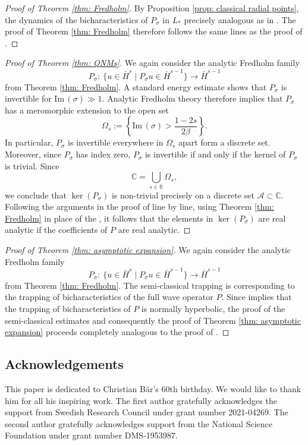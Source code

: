 \documentclass[pdftex]{sigma}
\renewcommand{\Im}{\mathrm{Im} \,}
\newcommand{\A}{\mathcal A}
\renewcommand{\b}{\beta}
\newcommand{\s}{\sigma}
\newcommand{\R}[0]{\mathbb{R}}
\newcommand{\C}[0]{\mathbb{C}}
\numberwithin{equation}{section}
\begin{document}
\begin{proof}[Proof of Theorem \ref{thm: Fredholm}]
By Proposition \ref{prop: classical radial points}, the dynamics of the bicharacteristics of $P_\s$ in $L_*$ precisely analogous as in \cite[Section~6.1]{V2013}.
The proof of Theorem \ref{thm: Fredholm} therefore follows the same lines as the proof of \cite[Theorem~1.4]{V2013}.
\end{proof}



\begin{proof}[Proof of Theorem \ref{thm: QNMs}]
We again consider the analytic Fredholm family
\[
  P_\s\colon\ \big\{u \in \bar H^s \mid P_\s u \in \bar H^{s-1} \big\} \to \bar H^{s-1}
\]
from Theorem \ref{thm: Fredholm}.
A standard energy estimate shows that $P_\s$ is invertible for $\Im(\s) \gg 1$.
Analytic Fredholm theory therefore implies that $P_\s$ has a meromorphic extension to the open set
\[
	\Omega_s
		:= \left\{ \Im (\s) > \frac{1 - 2s}{2\b} \right\}.
\]
In particular, $P_\s$ is invertible everywhere in $\Omega_s$ apart form a discrete set.
Moreover, since $P_\s$ has index zero, $P_\s$ is invertible if and only if the kernel of $P_\s$ is trivial.
Since
\[
	\C = \bigcup_{s \in \R} \Omega_s,
\]
we conclude that $\ker(P_\s)$ is non-trivial precisely on a discrete set $\A \subset \C$.
Following the arguments in the proof of \cite[Theorem~1.2]{PV2021} line by line, using Theorem \ref{thm: Fredholm} in place of the \cite[Theorem~1.1]{V2013}, it follows that the elements in $\ker(P_\s)$ are real analytic if the coefficients of $P$ are real analytic.
\end{proof}

\begin{proof}[Proof of Theorem \ref{thm: asymptotic expansion}]
We again consider the analytic Fredholm family
\[
  P_\s\colon\ \big\{u \in \bar H^s \mid P_\s u \in \bar H^{s-1} \big\} \to \bar H^{s-1}
\]
from Theorem \ref{thm: Fredholm}.
The semi-classical trapping is corresponding to the trapping of bicharacteristics of the full wave operator $P$.
Since \cite[Theorem~3.2]{PV2023} implies that the trapping of bicharacteristics of $P$ is normally hyperbolic, the proof of the semi-classical estimates and consequently the proof of Theorem \ref{thm: asymptotic expansion} proceeds completely analogous to the proof of \cite[Theorem~1.4]{V2013}.
\end{proof}


\subsection*{Acknowledgements}
This paper is dedicated to Christian B\"ar's 60th birthday.
We would like to thank him for all his inspiring work.
The first author gratefully acknowledges the support from Swedish Research Council under grant number 2021-04269.
The second author gratefully acknowledges support from the National Science Foundation under grant number DMS-1953987.
\end{document}
